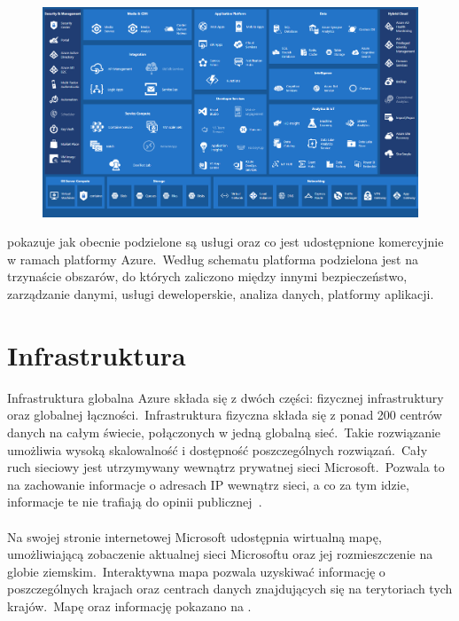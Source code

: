 \begin{figure}[H]
    \includegraphics[width=\textwidth]{images/ms_azure}
    \label{fig:ms-azure}
\end{figure}

 pokazuje jak obecnie podzielone są usługi oraz co jest udostępnione komercyjnie w ramach platformy Azure.\ Według schematu platforma podzielona jest na trzynaście obszarów, do których zaliczono między innymi bezpieczeństwo, zarządzanie danymi, usługi deweloperskie, analiza danych, platformy aplikacji.

\section{Infrastruktura}
Infrastruktura globalna Azure składa się z dwóch części: fizycznej infrastruktury oraz globalnej łączności.\ Infrastruktura fizyczna składa się z ponad 200 centrów danych na całym świecie, połączonych w jedną globalną sieć.\ Takie rozwiązanie umożliwia wysoką skalowalność i dostępność poszczególnych rozwiązań.\ Cały ruch sieciowy jest utrzymywany wewnątrz prywatnej sieci Microsoft.\ Pozwala to na zachowanie informacje o adresach IP wewnątrz sieci, a co za tym idzie, informacje te nie trafiają do opinii publicznej~\cite{MicrosoftAzureb}.\\ \\

Na swojej stronie internetowej Microsoft udostępnia wirtualną mapę, umożliwiającą zobaczenie aktualnej sieci Microsoftu oraz jej rozmieszczenie na globie ziemskim.\ Interaktywna mapa pozwala uzyskiwać informację o poszczególnych krajach oraz centrach danych znajdujących się na terytoriach tych krajów.\ Mapę oraz informację pokazano na .

